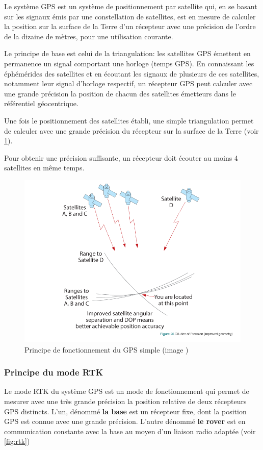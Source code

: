 \documentclass[12pt,a4paper]{report}
\begin{document}
		\para Le système GPS est un système de positionnement par satellite qui, en se basant sur les signaux émis par une constellation de satellites, est en mesure de calculer la position sur la surface de la Terre d'un récepteur avec une précision de l'ordre de la dizaine de mètres, pour une utilisation courante.
		
		\para Le principe de base est celui de la triangulation: les satellites GPS émettent en permanence un signal comportant une horloge (temps GPS). En connaissant les éphémérides des satellites et en écoutant les signaux de plusieurs de ces satellites, notamment leur signal d'horloge respectif, un récepteur GPS peut calculer avec une grande précision la position de chacun des satellites émetteurs dans le référentiel géocentrique.
		
		\para Une fois le positionnement des satellites établi, une simple triangulation permet de calculer avec une grande précision du récepteur sur la surface de la Terre (voir \ref{fig:gnss}).
		
		\para Pour obtenir une précision suffisante, un récepteur doit écouter au moins 4 satellites en même temps.
		
		\begin{figure}[h!]
			\centering
			\includegraphics[width=0.7\linewidth]{img/gnss}
			\caption[gpssimple]{Principe de fonctionnement du GPS simple (image \cite{jeffrey_introduction_2010})}
			\label{fig:gnss}
		\end{figure}
		
		\subsubsection{Principe du mode RTK}
		Le mode RTK du système GPS est un mode de fonctionnement qui permet de mesurer avec une très grande précision la position relative de deux récepteurs GPS distincts. L'un, dénommé \textbf{la base} est un récepteur fixe, dont la position GPS est connue avec une grande précision. L'autre dénommé \textbf{le rover} est en communication constante avec la base au moyen d'un liaison radio adaptée (voir \ref{fig:rtk})
		
\end{document}

